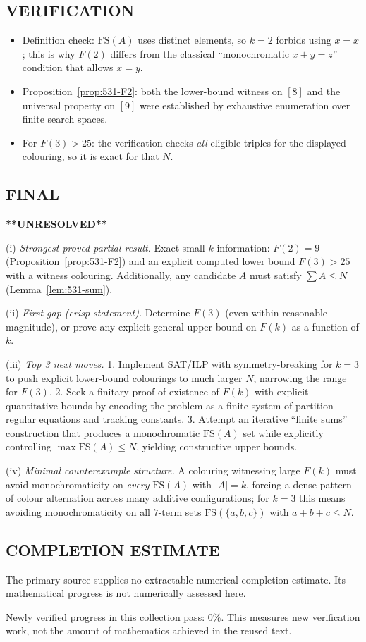 \subsection*{VERIFICATION}
\begin{itemize}
\item Definition check: $\mathrm{FS}(A)$ uses distinct elements, so $k=2$ forbids using $x=x$; this is why $F(2)$ differs from the classical ``monochromatic $x+y=z$'' condition that allows $x=y$.
\item Proposition~\ref{prop:531-F2}: both the lower-bound witness on $[8]$ and the universal property on $[9]$ were established by exhaustive enumeration over finite search spaces.
\item For $F(3)>25$: the verification checks \emph{all} eligible triples for the displayed colouring, so it is exact for that $N$.
\end{itemize}

\subsection*{FINAL}
\textbf{**UNRESOLVED**}

(i) \emph{Strongest proved partial result.} Exact small-$k$ information: $F(2)=9$ (Proposition~\ref{prop:531-F2}) and an explicit computed lower bound $F(3)>25$ with a witness colouring. Additionally, any candidate $A$ must satisfy $\sum A\le N$ (Lemma~\ref{lem:531-sum}).

(ii) \emph{First gap (crisp statement).} Determine $F(3)$ (even within reasonable magnitude), or prove any explicit general upper bound on $F(k)$ as a function of $k$.

(iii) \emph{Top 3 next moves.}
1. Implement SAT/ILP with symmetry-breaking for $k=3$ to push explicit lower-bound colourings to much larger $N$, narrowing the range for $F(3)$.
2. Seek a finitary proof of existence of $F(k)$ with explicit quantitative bounds by encoding the problem as a finite system of partition-regular equations and tracking constants.
3. Attempt an iterative ``finite sums'' construction that produces a monochromatic $\mathrm{FS}(A)$ set while explicitly controlling $\max \mathrm{FS}(A)\le N$, yielding constructive upper bounds.

(iv) \emph{Minimal counterexample structure.} A colouring witnessing large $F(k)$ must avoid monochromaticity on \emph{every} $\mathrm{FS}(A)$ with $|A|=k$, forcing a dense pattern of colour alternation across many additive configurations; for $k=3$ this means avoiding monochromaticity on all $7$-term sets $\mathrm{FS}(\{a,b,c\})$ with $a+b+c\le N$.




\subsection*{COMPLETION ESTIMATE}
The primary source supplies no extractable numerical completion estimate. Its mathematical progress is not numerically assessed here.

Newly verified progress in this collection pass: $0\%$. This measures new verification work, not the amount of mathematics achieved in the reused text.

